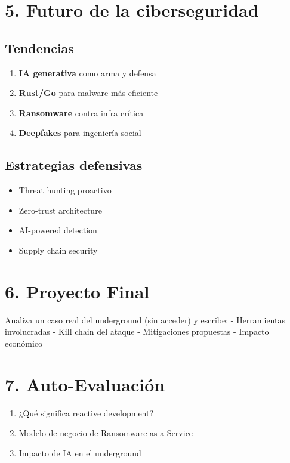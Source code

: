 \documentclass[
  letterpaper,
]{report}
\providecommand{\tightlist}{%
  \setlength{\itemsep}{0pt}\setlength{\parskip}{0pt}}
\begin{document}
\section{5. Futuro de la
ciberseguridad}\label{futuro-de-la-ciberseguridad}

\subsection{Tendencias}\label{tendencias}

\begin{enumerate}
\def\labelenumi{\arabic{enumi}.}
\tightlist
\item
  \textbf{IA generativa} como arma y defensa
\item
  \textbf{Rust/Go} para malware más eficiente
\item
  \textbf{Ransomware} contra infra crítica
\item
  \textbf{Deepfakes} para ingeniería social
\end{enumerate}

\subsection{Estrategias defensivas}\label{estrategias-defensivas}

\begin{itemize}
\tightlist
\item
  Threat hunting proactivo
\item
  Zero-trust architecture
\item
  AI-powered detection
\item
  Supply chain security
\end{itemize}

\section{6. Proyecto Final}\label{proyecto-final}

Analiza un caso real del underground (sin acceder) y escribe: -
Herramientas involucradas - Kill chain del ataque - Mitigaciones
propuestas - Impacto económico

\section{7. Auto-Evaluación}\label{auto-evaluaciuxf3n-11}

\begin{enumerate}
\def\labelenumi{\arabic{enumi}.}
\tightlist
\item
  ¿Qué significa reactive development?
\item
  Modelo de negocio de Ransomware-as-a-Service
\item
  Impacto de IA en el underground
\end{enumerate}
\end{document}
